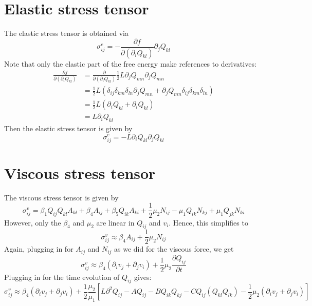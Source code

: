 \documentclass[reqno]{article}
\begin{document}
	\section{Elastic stress tensor}
	The elastic stress tensor is obtained via
	\begin{equation}
	\sigma^{e}_{ij} = -\frac{\partial f}{\partial (\partial_i Q_{kl})} \partial_j Q_{kl}
	\end{equation}
	Note that only the elastic part of the free energy make references to derivatives:
	\begin{equation}
	\begin{split}
		\frac{\partial f}{\partial (\partial_i Q_{kl})} &= \frac{\partial}{\partial (\partial_i Q_{kl})} \frac{1}{2} L \partial_j Q_{mn} \partial_j Q_{mn} \\
		&= \frac{1}{2} L (\delta_{ij}\delta_{km}\delta_{ln} \partial_j Q_{mn} + \partial_j Q_{mn} \delta_{ij}\delta_{km}\delta_{ln}) \\
		&= \frac{1}{2} L (\partial_i Q_{kl} + \partial_i Q_{kl}) \\
		&= L\partial_i Q_{kl}
	\end{split}
	\end{equation}
	Then the elastic stress tensor is given by
	\begin{equation}\label{eq:elastic-stress}
		\sigma^e_{ij} = -L\partial_i Q_{kl} \partial_j Q_{kl}
	\end{equation}
	
	\section{Viscous stress tensor}
	The viscous stress tensor is given by
	\begin{equation}
	\sigma^v_{ij} = \beta_1 Q_{ij}Q_{kl}A_{kl} + \beta_4 A_{ij} + \beta_5 Q_{ik} A_{ki} + \frac{1}{2} \mu_2 N_{ij} - \mu_1 Q_{ik}N_{kj} + \mu_1 Q_{jk}N_{ki}
	\end{equation}
	However, only the $\beta_4$ and $\mu_2$ are linear in $Q_{ij}$ and $v_i$. Hence, this simplifies to
	\begin{equation}
	\sigma^v_{ij} \approx \beta_4 A_{ij} + \frac{1}{2} \mu_2 N_{ij}
	\end{equation}
	Again, plugging in for $A_{ij}$ and $N_{ij}$ as we did for the viscous force, we get
	\begin{equation}\label{eq:visc-stress}
	\sigma^v_{ij} \approx \beta_4 (\partial_i v_j + \partial_j v_i) + \frac{1}{2} \mu_2  \frac{\partial Q_{ij}}{\partial t}
	\end{equation}
	Plugging in for the time evolution of $Q_{ij}$ gives:
	\begin{equation}
		\sigma^v_{ij} \approx 
		\beta_4 \left(\partial_i v_j + \partial_j v_i\right)
		+ \frac12 \frac{\mu_2}{\mu_1} \left[
		L\partial^2 Q_{ij}
		- A Q_{ij}
		- B Q_{ik} Q_{kj}
		- C Q_{ij} \left( Q_{kl} Q_{lk} \right)
		- \frac12 \mu_2 \left( \partial_i v_j + \partial_j v_i \right)
		\right]
	\end{equation}
	
\end{document}

